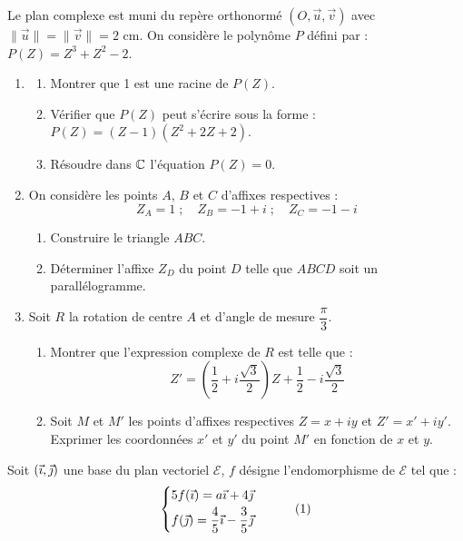 \documentclass[11pt]{article}
\begin{document}


Le plan complexe est muni du repère orthonormé $(O,\vec{u},\vec{v})$ avec $\|\vec{u}\| = \|\vec{v}\| = 2$ cm. On considère le polynôme $P$ défini par : $P(Z) = Z^3 + Z^2 - 2$.

\begin{enumerate}
  \item \begin{enumerate}[label=\alph*.]
    \item Montrer que 1 est une racine de $P(Z)$.
    \item Vérifier que $P(Z)$ peut s'écrire sous la forme : $P(Z) = (Z - 1)(Z^2 + 2Z + 2)$.
    \item Résoudre dans $\mathbb{C}$ l'équation $P(Z) = 0$.
  \end{enumerate}
  \item On considère les points $A$, $B$ et $C$ d'affixes respectives :
  \[ Z_A = 1 \;;\quad Z_B = -1 + i \;;\quad Z_C = -1 - i \]
  \begin{enumerate}[label=\alph*.]
    \item Construire le triangle $ABC$.
    \item Déterminer l'affixe $Z_D$ du point $D$ telle que $ABCD$ soit un parallélogramme.
  \end{enumerate}
  \item Soit $R$ la rotation de centre $A$ et d'angle de mesure $\dfrac{\pi}{3}$.
  \begin{enumerate}[label=\alph*.]
    \item Montrer que l'expression complexe de $R$ est telle que :
    \[ Z' = \left(\frac{1}{2} + i\frac{\sqrt{3}}{2}\right)Z + \frac{1}{2} - i\frac{\sqrt{3}}{2} \]
    \item Soit $M$ et $M'$ les points d'affixes respectives $Z = x + iy$ et $Z' = x' + iy'$. Exprimer les coordonnées $x'$ et $y'$ du point $M'$ en fonction de $x$ et $y$.
  \end{enumerate}
\end{enumerate}


Soit $(\vec{\imath},\vec{\jmath})$ une base du plan vectoriel $\mathcal{E}$, $f$ désigne l'endomorphisme de $\mathcal{E}$ tel que :
\begin{equation}
\begin{cases} 5f(\vec{\imath}) = a\vec{\imath} + 4\vec{\jmath} \\[0.5ex] f(\vec{\jmath}) = \dfrac{4}{5}\vec{\imath} - \dfrac{3}{5}\vec{\jmath} \end{cases} \tag{1}
\end{equation}
\end{document}
